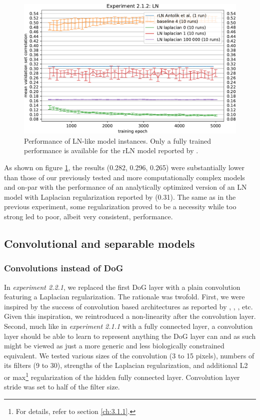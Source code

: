 \begin{figure}[H]
    \centering
    \includegraphics[width=1\textwidth]{../figures/05_2_1_2}
    \caption[Experiment 2.1.2]{Performance of LN-like model instances. Only a fully trained performance is available for the rLN model reported by \citeauthor{antolik}\protect\footnotemark.}
    \label{fig:5.2.1.2}
\end{figure}

As shown on figure \ref{fig:5.2.1.2}, the results (0.282, 0.296, 0.265) were substantially lower than those of our previously tested and more computationally complex models and on-par with the performance of an analytically optimized version of an LN model with Laplacian regularization reported by \cite{antolik} (0.31). The same as in the previous experiment, some regularization proved to be a necessity while too strong led to poor, albeit very consistent, performance.

\subsection{Convolutional and separable models}
\subsubsection{Convolutions instead of DoG}

In \textit{experiment 2.2.1}, we replaced the first DoG layer with a plain convolution featuring a Laplacian regularization. The rationale was twofold. First, we were inspired by the success of convolution based architectures as reported by \cite{klindt}, \cite{ecker}, \cite{Walke506956}, etc. Given this inspiration, we reintroduced a non-linearity after the convolution layer. Second, much like in \textit{experiment 2.1.1} with a fully connected layer, a convolution layer should be able to learn to represent anything the DoG layer can and as such might be viewed as just a more generic and less biologically constrained equivalent. We tested various sizes of the convolution (3 to 15 pixels), numbers of its filters (9 to 30), strengths of the Laplacian regularization, and additional L2 or max\footnote{For details, refer to section \ref{ch:3.1.1}.} regularization of the hidden fully connected layer. Convolution layer stride was set to half of the filter size.

